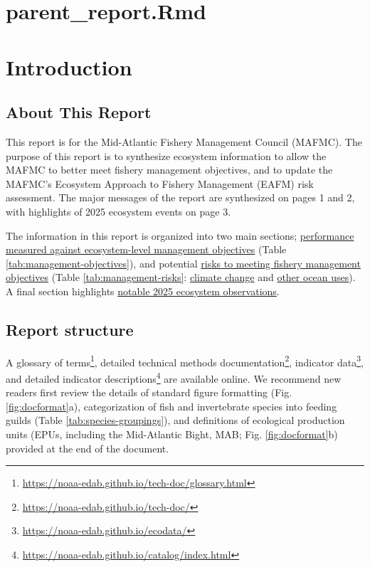 \documentclass[
  10pt,
]{article}
\author{}
\date{\vspace{-2.5em}}
\begin{document}
\section{parent\_report.Rmd}\label{parent_report.rmd}

\setcounter{page}{4}
\thispagestyle{fancy}

\section{Introduction}\label{introduction}

\subsection{About This Report}\label{about-this-report}

This report is for the Mid-Atlantic Fishery Management Council (MAFMC). The purpose of this report is to synthesize ecosystem information to allow the MAFMC to better meet fishery management objectives, and to update the MAFMC's Ecosystem Approach to Fishery Management (EAFM) risk assessment. The major messages of the report are synthesized on pages 1 and 2, with highlights of 2025 ecosystem events on page 3.

The information in this report is organized into two main sections; \hyperref[performance-relative-to-fishery-management-objectives]{performance measured against ecosystem-level management objectives} (Table \ref{tab:management-objectives}), and potential \hyperref[risks-to-meeting-fishery-management-objectives]{risks to meeting fishery management objectives} (Table \ref{tab:management-risks}: \hyperref[climate-and-ecosystem-change]{climate change} and \hyperref[other-ocean-uses-offshore-wind]{other ocean uses}). A final section highlights \hyperref[highlights]{notable 2025 ecosystem observations}.

\subsection{Report structure}\label{report-structure}

A glossary of terms\footnote{\url{https://noaa-edab.github.io/tech-doc/glossary.html}}, detailed technical methods documentation\footnote{\url{https://noaa-edab.github.io/tech-doc/}}, indicator data\footnote{\url{https://noaa-edab.github.io/ecodata/}}, and detailed indicator descriptions\footnote{\url{https://noaa-edab.github.io/catalog/index.html}} are available online. We recommend new readers first review the details of standard figure formatting (Fig. \ref{fig:docformat}a), categorization of fish and invertebrate species into feeding guilds (Table \ref{tab:species-groupings}), and definitions of ecological production units (EPUs, including the Mid-Atlantic Bight, MAB; Fig. \ref{fig:docformat}b) provided at the end of the document.
\end{document}

